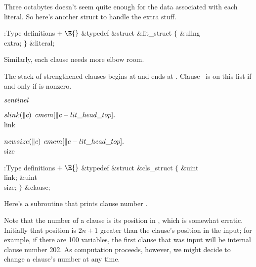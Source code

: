 Three octabytes doesn't seem quite enough for the data associated with
each literal. So here's another struct to handle the extra stuff.

\Y\B\4:Type definitions\X${}\mathrel+\E{}$\6
\&{typedef} \&{struct} \&{lit\_struct} ${}\{{}$\1\6
\&{ullng} \\{extra};\2\6
${}\}{}$ \&{literal};\par
\fi

Similarly, each clause needs more elbow room.

The stack of strengthened clauses begins at  and ends at
. Clause~ is on this list if and only if  is nonzero.

\Y\B\4\D$\\{sentinel}$ \5
\par
\B\4\D$\\{slink}(\|c)$ \5
$\\{cmem}[\|c-\\{lit\_head\_top}].{}$\\{link}\par
\B\4\D$\\{newsize}(\|c)$ \5
$\\{cmem}[\|c-\\{lit\_head\_top}].{}$\\{size}\par
\Y\B\4:Type definitions\X${}\mathrel+\E{}$\6
\&{typedef} \&{struct} \&{cls\_struct} ${}\{{}$\1\6
\&{uint} \\{link};\6
\&{uint} \\{size};\2\6
${}\}{}$ \&{clause};\par
\fi

Here's a subroutine that prints clause number .

Note that the number of a clause is its position in , which is
somewhat erratic. Initially that position is
$2n+1$ greater than the clause's position in the input; for example, if
there are 100 variables, the first clause that was input will be
internal clause number 202. As computation proceeds, however, we might
decide to change a clause's number at any time.

